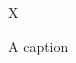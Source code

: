 \documentclass{article}
\begin{document}
\begin{figure}
\centering
X
\caption{A caption \foo}
\end{figure}
\end{document}
